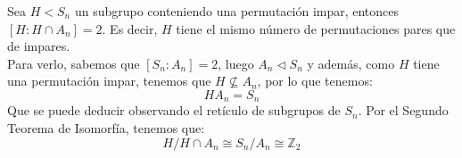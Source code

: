 \begin{ejemplo} %
    Sea $H<S_n$ un subgrupo conteniendo una permutación impar, entonces $[H:H\cap A_n]=2$. Es decir, $H$ tiene el mismo número de permutaciones pares que de impares.\\

    \noindent
    Para verlo, sabemos que $[S_n : A_n] = 2$, luego $A_n\lhd S_n$ y además, como $H$ tiene una permutación impar, tenemos que $H\nsubseteq A_n$, por lo que tenemos:
    \begin{equation*}
        HA_n = S_n
    \end{equation*}
    Que se puede deducir observando el retículo de subgrupos de $S_n$. Por el Segundo Teorema de Isomorfía, tenemos que:
    \begin{equation*}
        H/H\cap A_n \cong S_n/A_n \cong \mathbb{Z}_2
    \end{equation*}
\end{ejemplo}

